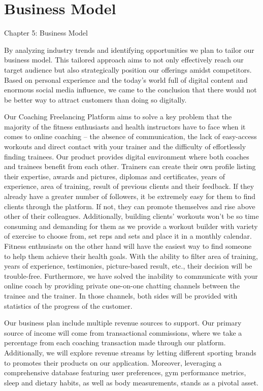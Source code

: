 \documentclass[12pt]{report}
\begin{document}
\section{Business Model}
Chapter 5: Business Model 

By analyzing industry trends and identifying opportunities we plan to tailor our business model. This tailored approach aims to not only effectively reach our target audience but also strategically position our offerings amidst competitors. Based on personal experience and the today’s world full of digital content and enormous social media influence, we came to the conclusion that there would not be better way to attract customers than doing so digitally.

Our Coaching Freelancing Platform aims to solve a key problem that the majority of the fitness enthusiasts and health instructors have to face when it comes to online coaching – the absence of communication, the lack of easy-access workouts and direct contact with your trainer and the difficulty of effortlessly finding trainees. Our product provides digital environment where both coaches and trainees benefit from each other. Trainers can create their own profile listing their expertise, awards and pictures, diplomas and certificates, years of experience, area of training, result of previous clients and their feedback. If they already have a greater number of followers, it be extremely easy for them to find clients through the platform. If not, they can promote themselves and rise above other of their colleagues. Additionally, building clients’ workouts won’t be so time consuming and demanding for them as we provide a workout builder with variety of exercise to choose from, set reps and sets and place it in a monthly calendar. Fitness enthusiasts on the other hand will have the easiest way to find someone to help them achieve their health goals. With the ability to filter area of training, years of experience, testimonies, picture-based result, etc., their decision will be trouble-free. Furthermore, we have solved the inability to communicate with your online coach by providing private one-on-one chatting channels between the trainee and the trainer. In those channels, both sides will be provided with statistics of the progress of the customer.

Our business plan include multiple revenue sources to support. Our primary source of income will come from transactional commissions, where we take a percentage from each coaching transaction made through our platform. Additionally, we will explore revenue streams by letting different sporting brands to promotes their products on our application. Moreover, leveraging a comprehensive database featuring user preferences, gym performance metrics, sleep and dietary habits, as well as body measurements, stands as a pivotal asset.
\end{document}
